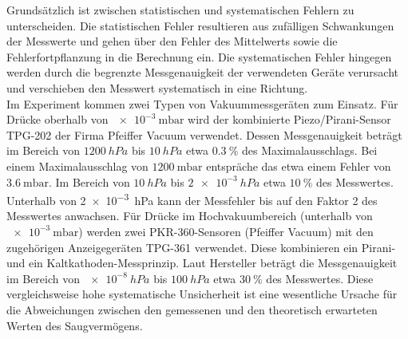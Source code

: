 \noindent Grundsätzlich ist zwischen statistischen und systematischen Fehlern
zu unterscheiden. Die statistischen Fehler resultieren aus zufälligen Schwankungen
der Messwerte und gehen über den Fehler des Mittelwerts sowie die Fehlerfortpflanzung
in die Berechnung ein. Die systematischen Fehler hingegen werden durch die
begrenzte Messgenauigkeit der verwendeten Geräte verursacht und verschieben
den Messwert systematisch in eine Richtung.
\\ 
\noindent Im Experiment kommen zwei Typen von Vakuummessgeräten zum Einsatz.
Für Drücke oberhalb von $\qty{e-3}{\milli\bar}$ wird der kombinierte 
Piezo/Pirani-Sensor TPG-202 der Firma Pfeiffer Vacuum verwendet. Dessen
Messgenauigkeit beträgt im Bereich von $\qty{1200}{hPa}$ bis $\qty{10}{hPa}$
etwa $\qty{0,3}{\%}$ des Maximalausschlags. Bei einem Maximalausschlag von $\qty{1200}{\milli\bar}$ entspräche 
das etwa einem Fehler von $\qty{3,6}{\milli\bar}$. Im Bereich von $\qty{10}{hPa}$ bis $\qty{2e-3}{hPa}$ 
etwa $\qty{10}{\%}$ des Messwertes. Unterhalb von \qty{2e-3}{hPa} kann der
Messfehler bis auf den Faktor 2 des Messwertes anwachsen. Für Drücke im Hochvakuumbereich
(unterhalb von $\qty{e-3}{\milli\bar}$) werden zwei PKR-360-Sensoren
(Pfeiffer Vacuum) mit den zugehörigen Anzeigegeräten TPG-361 verwendet. Diese
kombinieren ein Pirani- und ein Kaltkathoden-Messprinzip. Laut Hersteller beträgt
die Messgenauigkeit im Bereich von $\qty{e-8}{hPa}$ bis $\qty{100}{hPa}$ etwa
$\qty{30}{\%}$ des Messwertes. Diese vergleichsweise hohe systematische Unsicherheit
ist eine wesentliche Ursache für die Abweichungen zwischen den gemessenen und
den theoretisch erwarteten Werten des Saugvermögens. \cite{anleitung12}